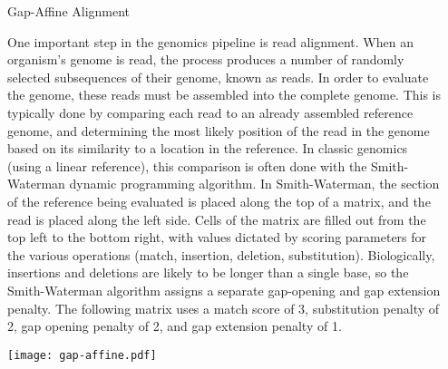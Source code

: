 \documentclass{cbxposter}
\renewcommand{\smallskip}{\vspace{0.16667in}}
\begin{document}
\begin{frame}[fragile,t]{}
\begin{columns}[T]
\begin{column}{10.5in}
\end{column}


\begin{column}{10.5in}
\vspace{0.4in}


\begin{block}{Gap-Affine Alignment}
  \smallskip

  One important step in the genomics pipeline is read alignment. When an
  organism's genome is read, the process produces a number of randomly
  selected subsequences of their genome, known as reads. In order to
  evaluate the genome, these reads must be assembled into the complete
  genome. This is typically done by comparing each read to an already
  assembled reference genome, and determining the most likely position of
  the read in the genome based on its similarity to a location in the
  reference. In classic genomics (using a linear reference), this comparison
  is often done with the Smith-Waterman dynamic programming algorithm. In
  Smith-Waterman, the section of the reference being evaluated is placed
  along the top of a matrix, and the read is placed along the left side.
  Cells of the matrix are filled out from the top left to the bottom right,
  with values dictated by scoring parameters for the various operations
  (match, insertion, deletion, substitution). Biologically, insertions and
  deletions are likely to be longer than a single base, so the Smith-Waterman
  algorithm assigns a separate gap-opening and gap extension penalty. The
  following matrix uses a match score of 3, substitution penalty of 2, gap
  opening penalty of 2, and gap extension penalty of 1.

  \begin{center}
    \texttt{[image: gap-affine.pdf]}
  \end{center}

\end{block}



\end{column}
\end{columns}
\end{frame}
\end{document}
